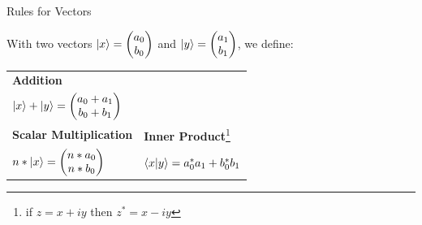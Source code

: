 \documentclass{beamer}
\begin{document}
\begin{frame}[label=vectors]{Rules for Vectors}

    With two vectors $\ket{x} = \begin{pmatrix} a_0 \\ b_0 \end{pmatrix}$ and $\ket{y} = \begin{pmatrix} a_1 \\ b_1 \end{pmatrix}$, we define:\vfill

    \centering
    \begin{tabular}{l l}
        \textbf{Addition} & \\
        \begin{math}
            \ket{x}+\ket{y} = \begin{pmatrix}
                a_0+a_1 \\ b_0+b_1
            \end{pmatrix}
        \end{math} & \\[3ex]
        \textbf{Scalar Multiplication} & \textbf{Inner Product}\footnote{if $z=x+iy$ then $z^*=x-iy$} \\
               \begin{math}
            n * \ket{x} = \begin{pmatrix}
                n * a_0 \\ n * b_0
            \end{pmatrix}
        \end{math} &
        \begin{math}
            \braket{x}{y}= a_0^*a_1 + b_0^*b_1
        \end{math}
    \end{tabular}
    
\end{frame}
\end{document}
